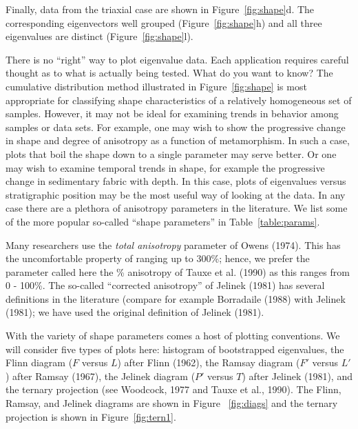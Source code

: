 Finally, data from the triaxial case are shown in Figure~\ref{fig:shape}d.  The corresponding eigenvectors well grouped
(Figure~\ref{fig:shape}h) and all three
eigenvalues are distinct (Figure~\ref{fig:shape}l).   


 
There is no ``right'' way to plot eigenvalue data.  Each application requires careful thought as to what is actually being tested.  What do you want to know?  
The cumulative distribution method illustrated in Figure~\ref{fig:shape}
 is most appropriate for  classifying shape
characteristics of a relatively homogeneous set of samples.  However,  
it may not be ideal for examining trends in behavior among samples or data sets.
For example, one may wish to show the progressive change in shape and
degree of anisotropy as a function of metamorphism. In such a case, plots that boil the shape down to a single parameter may serve better.   Or one may wish to examine temporal trends in shape, for example the progressive change in sedimentary fabric with depth.  In this case, plots of eigenvalues versus stratigraphic position may be the most useful way of looking at the data.    In any case there are a plethora of anisotropy parameters in the literature.  
 We list some of the more 
popular so-called ``shape parameters'' in Table~\ref{table:params}.


Many researchers use the 
{\it total anisotropy}  parameter of 
Owens (1974). \nocite{owens74}
This has the uncomfortable property of ranging up to 300\%; hence, we prefer
the parameter  called here the \% anisotropy of 
Tauxe et al. (1990)\nocite{tauxe90} 
 as this
ranges from 0
 - 100\%.  The so-called ``corrected anisotropy'' of
  Jelinek (1981) \nocite{jelinek81}
  has several definitions in the literature (compare for example
 Borradaile (1988) \nocite{borradaile88} with 
   Jelinek (1981); 
we have used the  original definition of Jelinek (1981).  

With the variety of shape parameters comes a host of plotting conventions.  
We will consider five types of plots here: 
histogram of bootstrapped eigenvalues, the
Flinn diagram ($F$ versus $L$) after 
Flinn (1962), \nocite{flinn62} the 
Ramsay diagram ($F'$ versus $L'$) after 
 Ramsay (1967),\nocite{ramsay67}
 the 
 Jelinek diagram ($P'$ versus $T$) after 
Jelinek 
(1981),   \nocite{jelinek81} and the
 ternary projection (see 
Woodcock, 1977 \nocite{woodcock77}  and 
 Tauxe et al., 1990).  The Flinn, Ramsay, and Jelinek diagrams are shown in Figure
~\ref{fig:diags} and the ternary projection is shown in Figure~\ref{fig:tern1}.  

